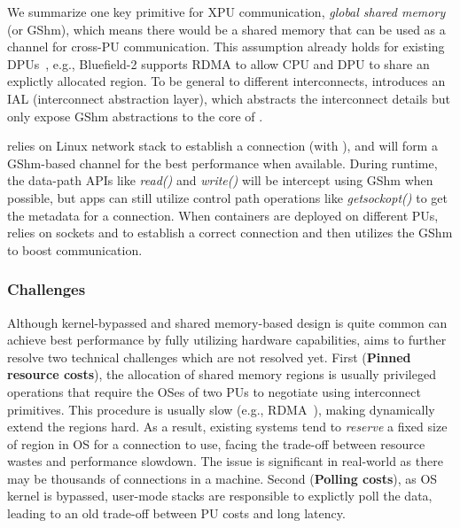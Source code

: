 We summarize one key primitive for XPU communication, \emph{global shared memory} (or GShm),
which means there would be a shared memory that can be used as a channel for cross-PU communication.
This assumption already holds for existing DPUs~\cite{mellanoxbf, marvel-liquidio}, e.g., Bluefield-2 supports RDMA to allow CPU and DPU to share an explictly allocated region.
To be general to different interconnects, \gsocket introduces an IAL (interconnect abstraction layer), which abstracts the interconnect details but only expose GShm abstractions to the core of \gsocket.

\gsocket relies on Linux network stack to establish a connection (with \giptable),
and will form a GShm-based channel for the best performance when available.
During runtime, the data-path APIs like \emph{read()} and \emph{write()} will be intercept using GShm when possible, but apps can still utilize control path operations like \emph{getsockopt()} to get the metadata for a connection.
When containers are deployed on different PUs, \gsocket relies on sockets and \giptable to establish a correct connection and then utilizes the GShm to boost communication.



\subsubsection{Challenges}
\label{subsubs:hetero-socket-challenges}
Although kernel-bypassed and shared memory-based design is quite common can achieve best performance by fully utilizing hardware capabilities,
\sys aims to further resolve two technical challenges which are not resolved yet.
First (\textbf{Pinned resource costs}), the allocation of shared memory regions is usually privileged operations that require the OSes of two PUs to negotiate using interconnect primitives.
This procedure is usually slow (e.g., RDMA~\cite{280746}), making dynamically extend the regions hard.
As a result, existing systems tend to \emph{reserve} a fixed size of region in OS for a connection to use, facing the trade-off between resource wastes and performance slowdown.
The issue is significant in real-world as there may be thousands of connections in a machine. 
Second (\textbf{Polling costs}), as OS kernel is bypassed, user-mode stacks are responsible to explictly poll the data, leading to an old trade-off between PU costs and long latency.


